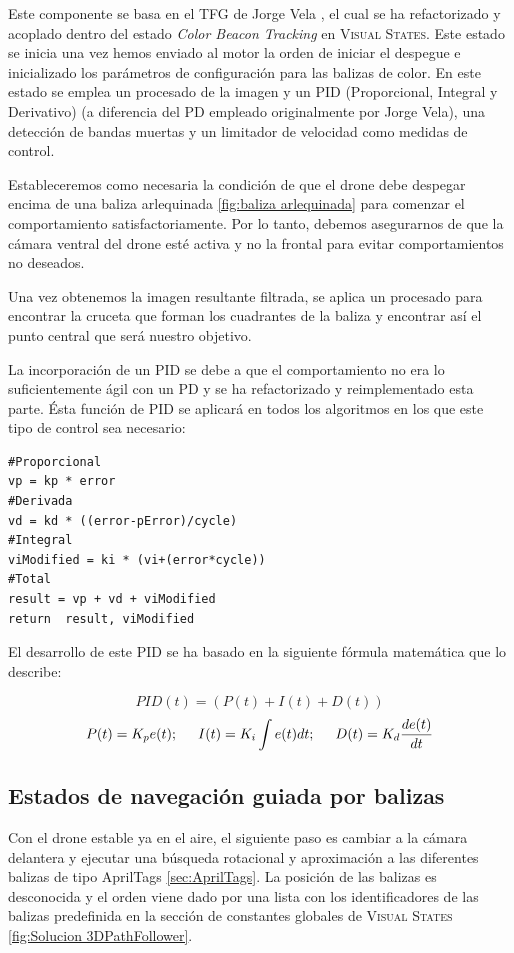 Este componente se basa en el TFG de Jorge Vela \cite{JorgeVela}, el cual se ha refactorizado y acoplado dentro del estado \textit{Color Beacon Tracking} en \textsc{Visual States}. Este estado se inicia una vez hemos enviado al motor la orden de iniciar el despegue e inicializado los parámetros de configuración para las balizas de color. En este estado se emplea un procesado de la imagen y un PID (Proporcional, Integral y Derivativo) (a diferencia del PD empleado originalmente por Jorge Vela), una detección de bandas muertas y un limitador de velocidad como medidas de control. 

Estableceremos como necesaria la condición de que el drone debe despegar encima de una baliza arlequinada \ref*{fig:baliza arlequinada} para comenzar el comportamiento satisfactoriamente. Por lo tanto, debemos asegurarnos de que la cámara ventral del drone esté activa y no la frontal para evitar comportamientos no deseados.

Una vez obtenemos la imagen resultante filtrada, se aplica un procesado para encontrar la cruceta que forman los cuadrantes de la baliza y encontrar así el punto central que será nuestro objetivo.

La incorporación de un PID  se debe a que el comportamiento no era lo suficientemente ágil con un PD  y se ha refactorizado y reimplementado esta parte. Ésta función de PID se aplicará en todos los algoritmos en los que este tipo de control sea necesario:

\begin{lstlisting}[backgroundcolor=\color{gray!15}]
#Proporcional
vp = kp * error
#Derivada
vd = kd * ((error-pError)/cycle)
#Integral 
viModified = ki * (vi+(error*cycle))
#Total
result = vp + vd + viModified
return  result, viModified
\end{lstlisting}

El desarrollo de este PID se ha basado en la siguiente fórmula matemática que lo describe:

\[PID(t) = (P(t) + I(t) + D(t))\]
\[P(t) = K_{p}e(t);\hspace{0.5cm}I(t) = K_{i}\int e(t) dt;\hspace{0.5cm}D(t) = K_{d}\dfrac{{de(t)}}{dt}\]

\subsection{Estados de navegación guiada por balizas}

Con el drone estable ya en el aire, el siguiente paso es cambiar a la cámara delantera y ejecutar una búsqueda rotacional y aproximación a las diferentes balizas de tipo AprilTags \ref{sec:AprilTags}. La posición de las balizas es desconocida y el orden viene dado por una lista  con los identificadores de las balizas predefinida en la sección de constantes globales de \textsc{Visual States} \ref{fig:Solucion 3DPathFollower}.

